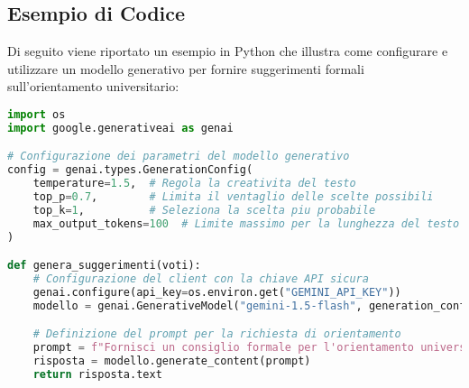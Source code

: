 \subsection*{Esempio di Codice}
Di seguito viene riportato un esempio in Python che illustra come configurare e utilizzare un modello generativo per fornire suggerimenti formali sull'orientamento universitario:

\begin{lstlisting}[language=Python, caption=Esempio di utilizzo di un modello generativo per l'orientamento universitario, basicstyle=\ttfamily\small, breaklines=true]
import os
import google.generativeai as genai

# Configurazione dei parametri del modello generativo
config = genai.types.GenerationConfig(
    temperature=1.5,  # Regola la creativita del testo
    top_p=0.7,        # Limita il ventaglio delle scelte possibili
    top_k=1,          # Seleziona la scelta piu probabile
    max_output_tokens=100  # Limite massimo per la lunghezza del testo generato
)

def genera_suggerimenti(voti):
    # Configurazione del client con la chiave API sicura
    genai.configure(api_key=os.environ.get("GEMINI_API_KEY"))
    modello = genai.GenerativeModel("gemini-1.5-flash", generation_config=config)

    # Definizione del prompt per la richiesta di orientamento
    prompt = f"Fornisci un consiglio formale per l'orientamento universitario. Voti: {voti}"
    risposta = modello.generate_content(prompt)
    return risposta.text
\end{lstlisting}